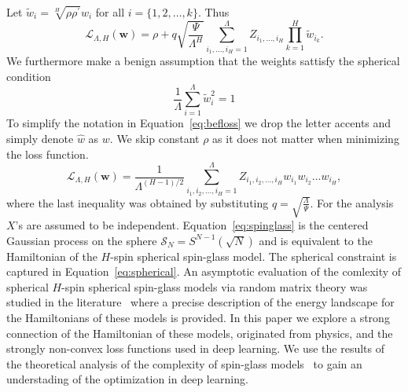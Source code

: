 \documentclass[twoside]{article}
\begin{document}
Let $\tilde{w}_i = \sqrt[H]{\rho\rho^{'}}w_i$ for all $i = \{1,2,\dots,k\}$.  Thus
\begin{equation}
\mathcal{L}_{\Lambda,H}({\bm w}) = \rho + q\sqrt{\!\!\frac{\Psi}{\Lambda^H}\!\!}\sum_{i_1,\dots,i_H=1}^{\Lambda}Z_{i_1,\dots,i_H}\prod_{k = 1}^{H}\tilde{w}_{i_k}.
\label{eq:befloss}
\end{equation}
We furthermore make a benign assumption that the weights sattisfy the spherical condition 
\begin{equation}
\frac{1}{\Lambda}\sum_{i=1}^{\Lambda}\tilde{w}_i^2 = 1
\label{eq:spherical}
\end{equation}
To simplify the notation in Equation~\ref{eq:befloss} we drop the letter accents and simply denote $\hat{w}$ as $w$. We skip constant $\rho$ as it does not matter when minimizing the loss function.
\begin{equation}
\mathcal{L}_{\Lambda,H}({\bm w}) = \frac{1}{\Lambda^{(H-1)/2}}\!\!\!\!\sum_{i_1,i_2,\dots,i_H=1}^{\Lambda}\!\!\!\!\!\!\!Z_{i_1,i_2,\dots,i_H}w_{i_1}w_{i_2}\dots\!w_{i_H},
\label{eq:spinglass}
\end{equation}
where the last inequality was obtained by substituting $q = \sqrt{\frac{\Lambda}{\Psi}}$. For the analysis $X$'s are assumed to be independent. Equation~\ref{eq:spinglass} is the centered Gaussian process on the sphere $\mathcal{S}_{N} = S^{N-1}(\sqrt{N})$ and is equivalent to the Hamiltonian of the $H$-spin spherical spin-glass model. The spherical constraint is captured in Equation~\ref{eq:spherical}. An asymptotic evaluation of the comlexity of spherical $H$-spin spherical spin-glass models via random matrix theory was studied in the literature~\cite{AAC2010} where a precise description of the energy landscape for the Hamiltonians of these models is provided. In this paper we explore a strong connection of the Hamiltonian of these models, originated from physics, and the strongly non-convex loss functions used in deep learning. We use the results of the theoretical analysis of the complexity of spin-glass models~\cite{AAC2010} to gain an understading of the optimization in deep learning. 
\end{document}
